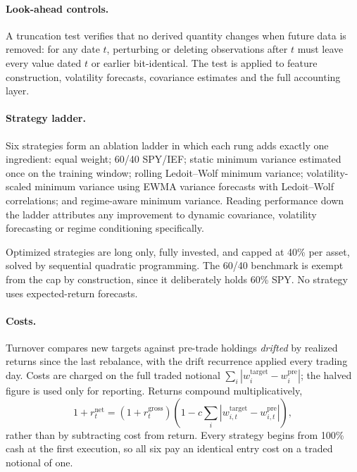 \documentclass[11pt,letterpaper]{article}
\begin{document}
\paragraph{Look-ahead controls.} A truncation test verifies that no
derived quantity changes when future data is removed: for any date $t$,
perturbing or deleting observations after $t$ must leave every value
dated $t$ or earlier bit-identical. The test is applied to feature
construction, volatility forecasts, covariance estimates and the full
accounting layer.

\paragraph{Strategy ladder.} Six strategies form an ablation ladder in
which each rung adds exactly one ingredient:
equal weight; 60/40 SPY/IEF; static minimum variance estimated once on
the training window; rolling Ledoit--Wolf minimum variance;
volatility-scaled minimum variance using EWMA variance forecasts with
Ledoit--Wolf correlations; and regime-aware minimum variance. Reading performance
down the ladder attributes any improvement to dynamic covariance,
volatility forecasting or regime conditioning specifically.

Optimized strategies are long only, fully invested, and capped at 40\%
per asset, solved by sequential quadratic programming. The 60/40
benchmark is exempt from the cap by construction, since it deliberately
holds 60\% SPY. No strategy uses expected-return forecasts.

\paragraph{Costs.} Turnover compares new targets against pre-trade
holdings \emph{drifted} by realized returns since the last rebalance,
with the drift recurrence applied every trading day. Costs are charged
on the full traded notional $\sum_i |w^{\text{target}}_i -
w^{\text{pre}}_i|$; the halved figure is used only for reporting.
Returns compound multiplicatively,
\begin{equation}
1 + r^{\text{net}}_t = \left(1 + r^{\text{gross}}_t\right)
\left(1 - c \sum_i \left| w^{\text{target}}_{i,t} -
w^{\text{pre}}_{i,t} \right| \right),
\end{equation}
rather than by subtracting cost from return. Every strategy begins from
100\% cash at the first execution, so all six pay an identical entry
cost on a traded notional of one.
\end{document}
